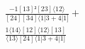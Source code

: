 \documentclass[varwidth, border=5pt]{standalone}
\begin{document}
\begin{my}
$\begin{gathered}
\scriptscriptstyle\frac{-1[13]²[23]⟨12⟩}{[24][34]⟨1|3+4|1]} +\\
\scriptscriptstyle\frac{1⟨14⟩[12]⟨12⟩[13]}{⟨13⟩[24]⟨1|3+4|1]} \phantom{+}
\end{gathered}$
\end{my}
\end{document}
